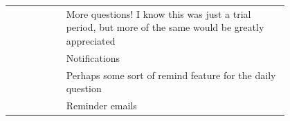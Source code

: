 \begin{longtable}{r|p{0.8\linewidth}}
		& More questions!  I know this was just a trial period, but more of the same would be greatly appreciated                                                                                                                                                                                                                                                                                                                                                                                                                                                                                                                                                                                                                                          \\
		& Notifications                                                                                                                                                                                                                                                                                                                                                                                                                                                                                                                                                                                                                                                                                                                                    \\
		& Perhaps some sort of remind feature for the daily question                                                                                                                                                                                                                                                                                                                                                                                                                                                                                                                                                                                                                                                                                       \\
		& Reminder emails                                                                                                                                                                                                                                                                                                                                                                                                                                                                                                                                                                                                                                                                                                                                  \\

\end{longtable}
